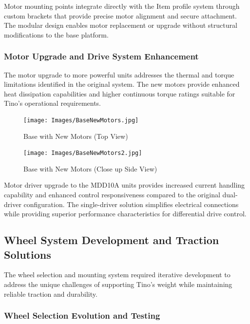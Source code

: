Motor mounting points integrate directly with the Item profile system through custom brackets that provide precise motor alignment and secure attachment. The modular design enables motor replacement or upgrade without structural modifications to the base platform.

\subsubsection{Motor Upgrade and Drive System Enhancement}

The motor upgrade to more powerful units addresses the thermal and torque limitations identified in the original system. The new motors provide enhanced heat dissipation capabilities and higher continuous torque ratings suitable for Tino's operational requirements.

\begin{figure}[H]
    \centering
    \begin{minipage}{0.45\textwidth}
        \centering
        \texttt{[image: Images/BaseNewMotors.jpg]}
        \caption{Base with New Motors (Top View)}
        \label{fig:base_new_motors}
    \end{minipage}
    \hfill
    \begin{minipage}{0.45\textwidth}
        \centering
        \texttt{[image: Images/BaseNewMotors2.jpg]}
        \caption{Base with New Motors (Close up Side View)}
        \label{fig:base_new_motors_side}
    \end{minipage}
\end{figure}

Motor driver upgrade to the MDD10A units provides increased current handling capability and enhanced control responsiveness compared to the original dual-driver configuration. The single-driver solution simplifies electrical connections while providing superior performance characteristics for differential drive control.

\subsection{Wheel System Development and Traction Solutions}

The wheel selection and mounting system required iterative development to address the unique challenges of supporting Tino's weight while maintaining reliable traction and durability.

\subsubsection{Wheel Selection Evolution and Testing}

